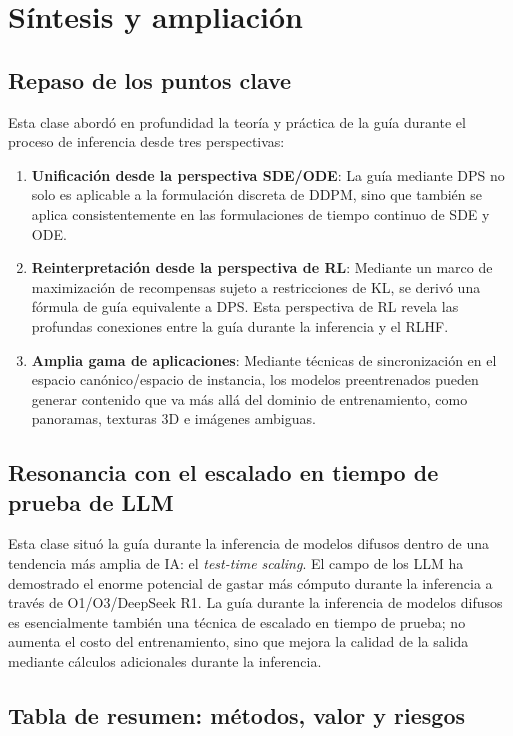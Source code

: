 \section{Síntesis y ampliación}

\subsection{Repaso de los puntos clave}

Esta clase abordó en profundidad la teoría y práctica de la guía durante el proceso de inferencia desde tres perspectivas:

\begin{enumerate}
    \item \textbf{Unificación desde la perspectiva SDE/ODE}: La guía mediante DPS no solo es aplicable a la formulación discreta de DDPM, sino que también se aplica consistentemente en las formulaciones de tiempo continuo de SDE y ODE.
    \item \textbf{Reinterpretación desde la perspectiva de RL}: Mediante un marco de maximización de recompensas sujeto a restricciones de KL, se derivó una fórmula de guía equivalente a DPS. Esta perspectiva de RL revela las profundas conexiones entre la guía durante la inferencia y el RLHF.
    \item \textbf{Amplia gama de aplicaciones}: Mediante técnicas de sincronización en el espacio canónico/espacio de instancia, los modelos preentrenados pueden generar contenido que va más allá del dominio de entrenamiento, como panoramas, texturas 3D e imágenes ambiguas.
\end{enumerate}

\subsection{Resonancia con el escalado en tiempo de prueba de LLM}

Esta clase situó la guía durante la inferencia de modelos difusos dentro de una tendencia más amplia de IA: el \textit{test-time scaling}. El campo de los LLM ha demostrado el enorme potencial de gastar más cómputo durante la inferencia a través de O1/O3/DeepSeek R1. La guía durante la inferencia de modelos difusos es esencialmente también una técnica de escalado en tiempo de prueba; no aumenta el costo del entrenamiento, sino que mejora la calidad de la salida mediante cálculos adicionales durante la inferencia.

\subsection{Tabla de resumen: métodos, valor y riesgos}

